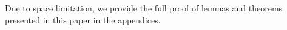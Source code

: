 Due to space limitation, we provide the full proof of lemmas and theorems
presented in this paper in the appendices.

\begin{comment}
The rest of this paper is organized as follows.
We motivate the uncertainty problem in Section~\ref{sec:model}.
We then formally describe the problem in Section~\ref{sec:framework},
including the completeness of the augmentation (\S~\ref{subsec:augment}),
hardness analysis (\S~\ref{subsec:hard}) and search algorithms
(\S~\ref{subsec:search}).
We continue by evaluating our framework through two case studies in
Section~\ref{sec:case}.  Finally, we present related works in
Section~\ref{sec:related} and concludes in Section~\ref{sec:conclusion}.
\end{comment}
